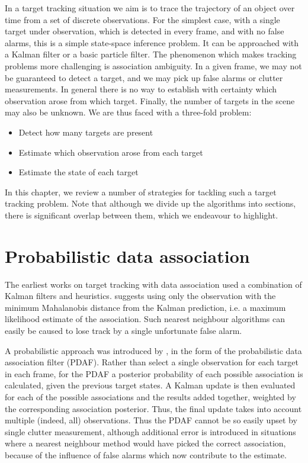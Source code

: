 In a target tracking situation we aim is to trace the trajectory of an object over time from a set of discrete observations. For the simplest case, with a single target under observation, which is detected in every frame, and with no false alarms, this is a simple state-space inference problem. It can be approached with a Kalman filter or a basic particle filter. The phenomenon which makes tracking problems more challenging is association ambiguity. In a given frame, we may not be guaranteed to detect a target, and we may pick up false alarms or clutter measurements. In general there is no way to establish with certainty which observation arose from which target. Finally, the number of targets in the scene may also be unknown. We are thus faced with a three-fold problem:

\begin{itemize}
	\item Detect how many targets are present
	\item Estimate which observation arose from each target
	\item Estimate the state of each target
\end{itemize}

In this chapter, we review a number of strategies for tackling such a target tracking problem. Note that although we divide up the algorithms into sections, there is significant overlap between them, which we endeavour to highlight.

\section{Probabilistic data association}
The earliest works on target tracking with data association used a combination of Kalman filters and heuristics. \cite{Sea1971} suggests using only the observation with the minimum Mahalanobis distance from the Kalman prediction, i.e. a maximum likelihood estimate of the association. Such nearest neighbour algorithms can easily be caused to lose track by a single unfortunate false alarm.

A probabilistic approach was introduced by \cite{Bar-Shalom1975}, in the form of the probabilistic data association filter (PDAF). Rather than select a single observation for each target in each frame, for the PDAF a posterior probability of each possible association is calculated, given the previous target states. A Kalman update is then evaluated for each of the possible associations and the results added together, weighted by the corresponding association posterior. Thus, the final update takes into account multiple (indeed, all) observations. Thus the PDAF cannot be so easily upset by single clutter measurement, although additional error is introduced in situations where a nearest neighbour method would have picked the correct association, because of the influence of false alarms which now contribute to the estimate.

